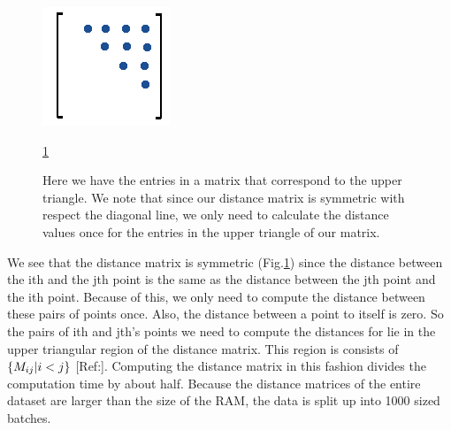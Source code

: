 \documentclass[12pt, a4paper, twocolumn, fullpage]{article}
\theoremstyle{plain}
\theoremstyle{definition}
\theoremstyle{remark}
\begin{document}
\begin{figure}[h]
    \includegraphics[width=\linewidth]{uptry.png}
    \caption{Here we have the entries in a matrix that correspond to the upper triangle. We note that since our distance matrix is symmetric with respect the diagonal line, we only need to calculate the distance values once for the entries in the upper triangle of our matrix.}
     \ref{uptry}
    \label{uptry}
\end{figure}
    

We see that the distance matrix is symmetric (Fig.\ref{uptry}) since the distance between the ith and the jth point is the same as the distance between the jth point and the ith point. Because of this, we only need to compute the distance between these pairs of points once. Also, the distance between a point to itself is zero. So the pairs of ith and jth's points we need to compute the distances for lie in the upper triangular region of the distance matrix. This region is consists of $\{ M_{ij} \space | \space i<j \}$ [Ref:]. Computing the distance matrix in this fashion divides the computation time by about half. Because the distance matrices of the entire dataset are larger than the size of the RAM, the data is split up into 1000 sized batches. 

\begin{algorithm}
\caption{We fill in our distance matrix by calculating the upper triangle of a NxN matrix. Our rows and columns range from 1 to N.}
\begin{algorithmic}
    \ENDFOR
\ENDFOR
\end{algorithmic}
\end{algorithm}
\end{document}
